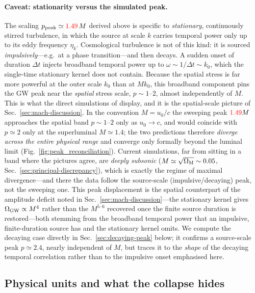 \documentclass[10pt,prd,aps,nobibnotes,superscriptaddress,preprintnumbers,notitlepage]{revtex4-1}
\newcommand{\add}[1]{{\color{red}#1}}
\newcommand{\add}[1]{#1}
\begin{document}
\paragraph{Caveat: stationarity versus the simulated peak.}
The scaling $p_{\rm peak}\simeq\add{1.49}\,M$ derived above is specific to
\emph{stationary}, continuously stirred turbulence, in which the source at scale
$k$ carries temporal power only up to its eddy frequency $\eta_k$. Cosmological
turbulence is not of this kind: it is sourced \emph{impulsively}---e.g.\ at a phase
transition---and then decays. A sudden onset of duration $\Delta t$ injects
broadband temporal power up to $\omega\sim1/\Delta t\sim k_0$, which the single-time
stationary kernel does not contain. Because the spatial stress is far more powerful
at the outer scale $k_0$ than at $M k_0$, this broadband component pins the GW peak
near the \emph{spatial} stress scale, $p\sim1$--$2$, almost independently of $M$.
This is what the direct simulations of \cite{RoperPol:2019wvy} display, and it is the
spatial-scale picture of Sec.~\ref{sec:mach-discussion}. In the convention
$M=u_0/c$ the sweeping peak $\add{1.49}M$ approaches the spatial band $p\sim1$--$2$ only
as $u_0\to c$, and would coincide with $p\simeq2$ only at the superluminal
$M\simeq1.4$; the two predictions therefore \emph{diverge across the entire
physical range} and converge only formally beyond the luminal limit
(Fig.~\ref{fig:peak_reconciliation}). Current simulations, far from sitting in a
band where the pictures agree, are \emph{deeply subsonic}
($M\simeq\sqrt{\Omega_{\rm M}}\sim0.05$, Sec.~\ref{sec:principal-discrepancy}),
which is exactly the regime of maximal divergence---and there the data follow the
source-scale (impulsive/decaying) peak, not the sweeping one. This peak
displacement is the spatial counterpart of the amplitude deficit noted in
Sec.~\ref{sec:mach-discussion}---the stationary kernel gives
$\Omega_{\rm GW}\propto M^4$ rather than the $M^{5\text{--}6}$ recovered once the
finite source duration is restored---both stemming from the broadband temporal
power that an impulsive, finite-duration source has and the stationary kernel
omits. We compute the decaying case directly in Sec.~\ref{sec:decaying-peak}
below; it confirms a source-scale peak $p\simeq2.4$, nearly independent of $M$,
but traces it to the \emph{shape} of the decaying temporal correlation rather
than to the impulsive onset emphasised here.

\subsection{Physical units and what the collapse hides}
\label{sec:peak-units}
\end{document}
